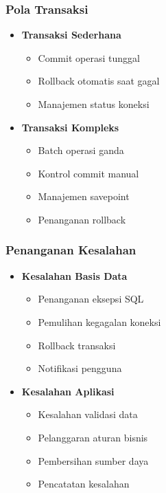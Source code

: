 \documentclass[12pt,a4paper]{article}
\begin{document}
\subsubsection{Pola Transaksi}
\begin{itemize}
    \item \textbf{Transaksi Sederhana}
    \begin{itemize}
        \item Commit operasi tunggal
        \item Rollback otomatis saat gagal
        \item Manajemen status koneksi
    \end{itemize}
    
    \item \textbf{Transaksi Kompleks}
    \begin{itemize}
        \item Batch operasi ganda
        \item Kontrol commit manual
        \item Manajemen savepoint
        \item Penanganan rollback
    \end{itemize}
\end{itemize}

\subsubsection{Penanganan Kesalahan}
\begin{itemize}
    \item \textbf{Kesalahan Basis Data}
    \begin{itemize}
        \item Penanganan eksepsi SQL
        \item Pemulihan kegagalan koneksi
        \item Rollback transaksi
        \item Notifikasi pengguna
    \end{itemize}
    
    \item \textbf{Kesalahan Aplikasi}
    \begin{itemize}
        \item Kesalahan validasi data
        \item Pelanggaran aturan bisnis
        \item Pembersihan sumber daya
        \item Pencatatan kesalahan
    \end{itemize}
\end{itemize}
\end{document}
